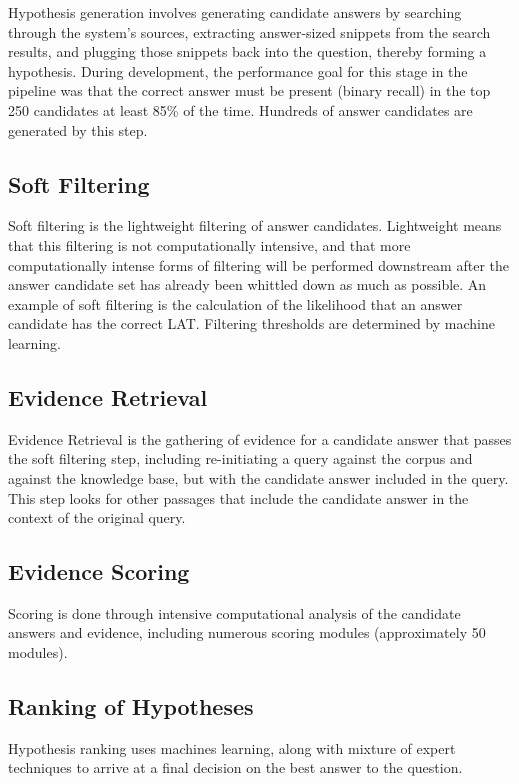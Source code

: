 Hypothesis generation involves generating candidate answers by searching through the system’s sources, extracting answer-sized snippets from the search results, and plugging those snippets back into the question, thereby forming a hypothesis.  During development, the performance goal for this stage in the pipeline was that the correct answer must be present (binary recall) in the top 250 candidates at least 85\% of the time.  Hundreds of answer candidates are generated by this step.

\subsection{Soft Filtering}

Soft filtering is the lightweight filtering of answer candidates.  Lightweight means that this filtering is not computationally intensive, and that more computationally intense forms of filtering will be performed downstream after the answer candidate set has already been whittled down as much as possible.  An example of soft filtering is the calculation of the likelihood that an answer candidate has the correct LAT.  Filtering thresholds are determined by machine learning.

\subsection{Evidence Retrieval}

Evidence Retrieval is the gathering of evidence for a candidate answer that passes the soft filtering step, including re-initiating a query against the corpus and against the knowledge base, but with the candidate answer included in the query.  This step looks for other passages that include the candidate answer in the context of the original query.

\subsection{Evidence Scoring}

Scoring is done through intensive computational analysis of the candidate answers and evidence, including numerous scoring modules (approximately 50 modules).

\subsection{Ranking of Hypotheses}

Hypothesis ranking uses machines learning, along with mixture of expert techniques to arrive at a final
decision on the best answer to the question.


